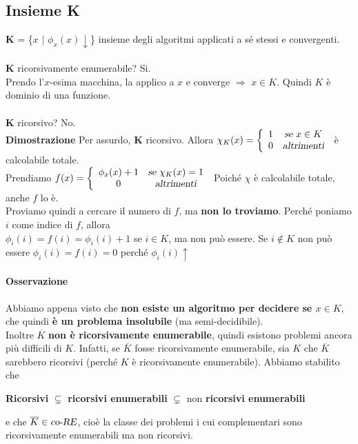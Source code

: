 \documentclass[10pt]{book}
\begin{document}
\subsection{Insieme K}
\textbf{K} = \{$x$ $|$ $\phi_x(x)\downarrow$\} insieme degli algoritmi applicati a sé stessi e convergenti.
\paragraph{}\textbf{K} ricorsivamente enumerabile? Si.\\
Prendo l'$x$-esima macchina, la applico a $x$ e converge $\Rightarrow$ $x \in K$. Quindi $K$ è dominio di una funzione.
\paragraph{}\textbf{K} ricorsivo? No.\\
\textbf{Dimostrazione} Per assurdo, \textbf{K} ricorsivo. Allora \begin{math} \chi_K(x) = 
\left\{
	\begin{array}{c c}
		1 & \textsl{se }x \in K\\
		0 & \textsl{altrimenti}
	\end{array}
\right.
\end{math}
è calcolabile totale.\\
Prendiamo \begin{math}
f(x) = 
	\left\{
	\begin{array}{c c}
		\phi_x(x) + 1 & \textsl{se }\chi_K(x) = 1\\
		0 & \textsl{altrimenti}
	\end{array}
	\right.
\end{math}
Poiché $\chi$ è calcolabile totale, anche $f$ lo è.\\
Proviamo quindi a cercare il numero di $f$, ma \textbf{non lo troviamo}. Perché poniamo $i$ come indice di $f$, allora\\$\phi_i(i) = f(i) = \phi_i(i) + 1$ se $i \in K$, ma non può essere. Se $i \not\in K$ non può essere $\phi_i(i) = f(i) = 0$ perché $\phi_i(i)\uparrow$
\paragraph{Osservazione} Abbiamo appena visto che \textbf{non esiste un algoritmo per decidere se $x\in K$}, che quindi \textbf{è un problema insolubile} (ma semi-decidibile).\\
Inoltre $\overline{K}$ \textbf{non è ricorsivamente enumerabile}, quindi esistono problemi ancora più difficili di $K$. Infatti, se $\overline{K}$ fosse ricorsivamente enumerabile, sia $K$ che $\overline{K}$ sarebbero ricorsivi (perché $K$ è ricorsivamente enumerabile). Abbiamo stabilito che
\begin{center}
\textbf{Ricorsivi} $\subsetneq$ \textbf{ricorsivi enumerabili} $\subsetneq$ non \textbf{ricorsivi enumerabili}
\end{center}
e che $\overline{K}\in \textsl{co-RE}$, cioè la classe dei problemi i cui complementari sono ricorsivamente enumerabili ma non ricorsivi.
\end{document}
